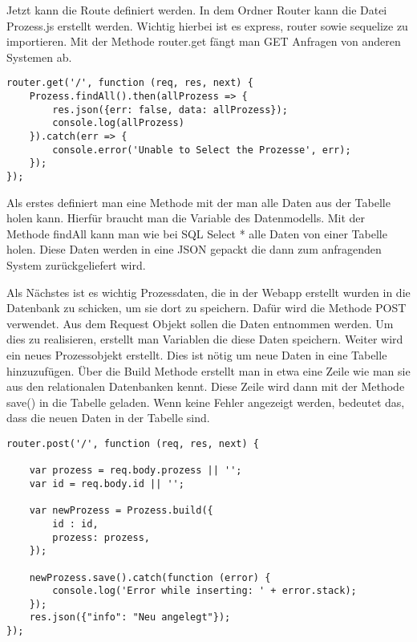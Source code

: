 \documentclass[a4paper,11pt]{scrreprt}
\begin{document}
Jetzt kann die Route definiert werden. In dem Ordner Router kann die Datei Prozess.js erstellt werden. Wichtig hierbei ist es express, router sowie sequelize zu importieren.
Mit der Methode router.get fängt man GET Anfragen von anderen Systemen ab.
 \begin{lstlisting}
router.get('/', function (req, res, next) {
    Prozess.findAll().then(allProzess => {
        res.json({err: false, data: allProzess});
        console.log(allProzess)
    }).catch(err => {
        console.error('Unable to Select the Prozesse', err);
    });
});
\end{lstlisting}
Als erstes definiert man eine Methode mit der man alle Daten aus der Tabelle holen kann. Hierfür braucht man die Variable des Datenmodells. Mit der Methode findAll kann man wie bei SQL Select * alle Daten von einer Tabelle holen. Diese Daten werden in eine JSON gepackt die dann zum anfragenden System zurückgeliefert wird. 

Als Nächstes ist es wichtig Prozessdaten, die in der Webapp erstellt wurden in die Datenbank zu schicken, um sie dort zu speichern. Dafür wird die Methode POST verwendet.
Aus dem Request Objekt sollen die Daten entnommen werden. Um dies zu realisieren, erstellt man Variablen die diese Daten speichern. Weiter wird ein neues Prozessobjekt erstellt. Dies ist nötig um neue Daten in eine Tabelle hinzuzufügen. Über die Build Methode erstellt man in etwa eine Zeile wie man sie aus den relationalen Datenbanken kennt. Diese Zeile wird dann mit der Methode save() in die Tabelle geladen. Wenn keine Fehler angezeigt werden, bedeutet das, dass die neuen Daten in der Tabelle sind.
 \begin{lstlisting}
router.post('/', function (req, res, next) {

    var prozess = req.body.prozess || '';
    var id = req.body.id || '';

    var newProzess = Prozess.build({
        id : id,
        prozess: prozess,
    });

    newProzess.save().catch(function (error) {
        console.log('Error while inserting: ' + error.stack);
    });
    res.json({"info": "Neu angelegt"});
});
\end{lstlisting}
\end{document}
